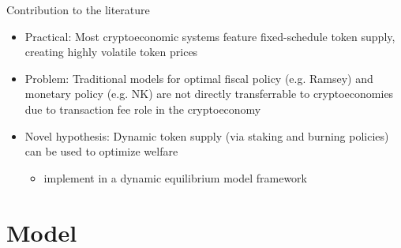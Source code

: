 \documentclass{beamer}
\begin{document}
\begin{frame}{Contribution to the literature}
\begin{itemize}
    \item Practical: Most cryptoeconomic systems feature fixed-schedule token supply, creating highly volatile token prices
    \item Problem: Traditional models for optimal fiscal policy (e.g. Ramsey) and monetary policy (e.g. NK) are not directly transferrable to cryptoeconomies due to transaction fee role in the cryptoeconomy
    \item Novel hypothesis: Dynamic token supply (via staking and burning policies) can be used to optimize welfare 
    \begin{itemize}
        \item implement in a dynamic equilibrium model framework
    \end{itemize}
\end{itemize}

\end{frame}





\section{Model}
\end{document}
